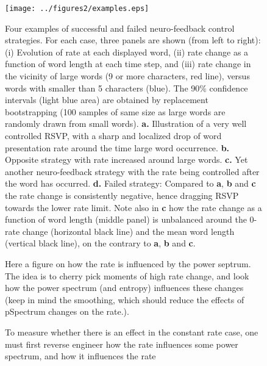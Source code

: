 
\begin{figure}[H]
\centering
\texttt{[image: ../figures2/examples.eps]}
\caption{Four examples of successful and failed neuro-feedback control strategies. For each case, three panels are shown (from left to right): (i) Evolution of rate at each displayed word, (ii) rate change as a function of word length at each time step, and (iii)  rate change in the vicinity of large words (9 or more characters, red line), versus words with smaller than 5 characters (blue). The 90\% confidence intervals (light blue area) are obtained by replacement bootstrapping (100 samples of same size as large words are randomly drawn from small words). {\bf a.} Illustration of a very well controlled RSVP, with a sharp and localized drop of word presentation rate around the time large word occurrence. {\bf b.} Opposite strategy with rate increased around large words. {\bf c.} Yet another neuro-feedback strategy with the rate being controlled after the word has occurred. {\bf d.} Failed strategy: Compared to {\bf a}, {\bf b} and {\bf c} the rate change is consistently negative, hence dragging RSVP towards the lower rate limit. Note also in {\bf c} how the rate change as a function of word length (middle panel) is unbalanced around the 0-rate change (horizontal black line) and the mean word length (vertical black line), on the  contrary to {\bf a}, {\bf b} and {\bf c}.}
\label{fig:examples}
\end{figure}


\begin{figure}[H]
\centering
\caption{Here a figure on how the rate is influenced by the power septrum. The idea is to cherry pick moments of high rate change, and look how the power spectrum (and entropy) influences these changes (keep in mind the smoothing, which should reduce the effects of pSpectrum changes on the rate.).}
\label{fig:S_vs_rate}
\end{figure}

\begin{figure}[H]
\centering
\caption{To measure whether there is an effect in the constant rate case, one must first reverse engineer how the rate influences some power spectrum, and how it influences the rate}
\label{fig:constant_rate}
\end{figure}



